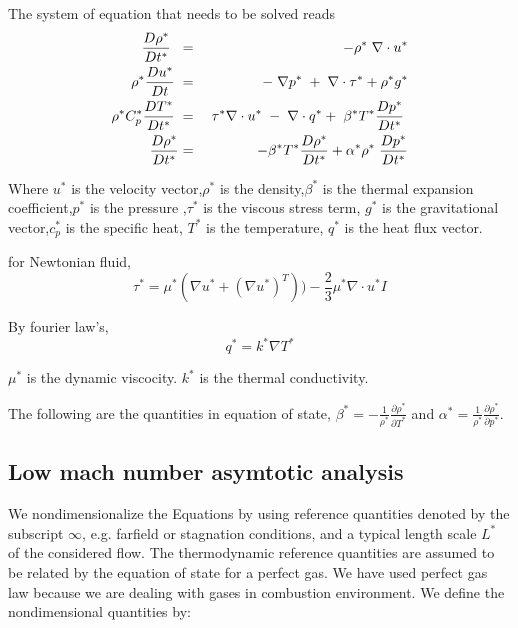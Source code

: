\documentclass[10pt]{ubthesis}
\begin{document}
The system of equation that needs to be solved reads
\begin{eqnarray}
\frac{D \rho^*}{D t^*}\hspace{1mm} \hspace{1mm} &=& - \rho^* \hspace{1mm}\nabla \cdot u^* \\
\rho^* \frac{D u^*}{D t} \hspace{1mm} &=& -\hspace{1mm}\nabla p^*\hspace{1mm}+\hspace{1mm}\nabla \cdot \tau^* + \rho^* g^* \\
\rho^* C_p^* \frac{D T^*}{D t^*} \hspace{1mm}&=&\hspace{1mm} \tau^* \nabla \cdot u^* \hspace{1mm}- \hspace{1mm}\nabla \cdot q^* + \hspace{1mm} \beta^* T^* \frac{D p^*}{D t^*}\hspace{1mm}\\
\frac{D \rho^*}{D t^*} &=& \hspace{1mm} - \beta^* T^* \frac{D \rho^*}{D t^*} + \alpha^* \rho^* \hspace{1mm}\frac{D p^*}{D t^*}
\end{eqnarray}

Where $u^*$ is the velocity vector,$\rho^*$ is the density,$\beta^*$ is the thermal expansion coefficient,$p^*$ is the pressure ,$\tau^*$ is the viscous stress term, $g^*$ is the gravitational vector,$c_p^*$ is the specific heat, $T^*$ is the temperature, $q^*$ is the heat flux vector. 

\bigskip

for Newtonian fluid, $$\tau^* = \mu^*(\nabla u^* +(\nabla u^*)^T)) - \frac{2}{3}\mu^*\nabla \cdot u^*I$$

By fourier law's, 
$$q^* =  k^* \nabla T^*$$

\bigskip

$\mu^*$ is the dynamic viscocity. $k^*$ is the thermal conductivity.

\bigskip

\noindent The following are the quantities in equation of state, $\beta^* = -\frac{1}{\rho^*}\frac{\partial \rho^*}{\partial T^*}$ and $\alpha^* = \frac{1}{\rho^*}\frac{\partial \rho^*}{\partial p^*}$.

\subsection{Low mach number asymtotic analysis}
We nondimensionalize the Equations by using reference quantities denoted by the subscript $\infty$,
e.g. farfield or stagnation conditions, and a typical length scale $L^*$ of the considered
flow. The thermodynamic reference quantities are assumed to be related by the equation of
state for a perfect gas. We have used perfect gas law because we are dealing with gases in combustion environment. We define the nondimensional quantities by:\\
\end{document}
